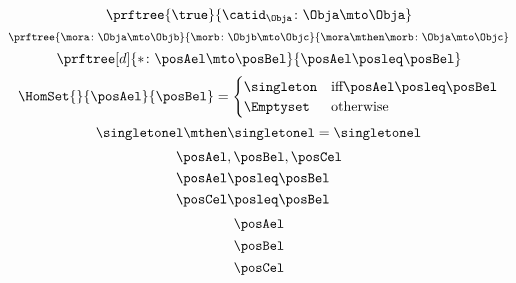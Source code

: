 {\begin{forslides}
\begin{equation}
        \end{equation}
        \begin{equation}
            \label{eq:id_ex}
            \prftree{\true}{\catid_\Obja\colon \Obja \mto \Obja}
        \end{equation}
        \begin{equation}
            \label{eq:comp_cat}
            \prftree{\mora \colon \Obja \mto \Objb}{\morb\colon \Objb \mto \Objc}{\mora\mthen \morb \colon \Obja \mto \Objc}
        \end{equation}
        \begin{equation}
            \label{eq:mor_pre}
            \prftree[d]{\ast\colon \posAel \mto \posBel}{\posAel \posleq \posBel}
        \end{equation}
        \begin{equation}
            \label{eq:hom_pre}
            \HomSet{}{\posAel}{\posBel}=\begin{cases}
                \singleton & \text{iff} \posAel \posleq \posBel \\
                \Emptyset  & \text{otherwise}
            \end{cases}
        \end{equation}
        \begin{equation}
            \label{eq:comp_pre}
            \singletonel \mthen \singletonel = \singletonel
        \end{equation}
        \begin{equation}
            \label{eq:ex_pre}
            \begin{aligned}
                 & \posAel,\posBel,\posCel \\
                 & \posAel \posleq \posBel \\
                 & \posCel \posleq \posBel
            \end{aligned}
        \end{equation}
        \begin{equation}
            \label{eq:pre_p}
            \posAel
        \end{equation}
        \begin{equation}
            \label{eq:pre_q}
            \posBel
        \end{equation}
        \begin{equation}
            \label{eq:pre_r}
            \posCel
        \end{equation}
        \begin{equation}

\end{equation}
\end{forslides}}
